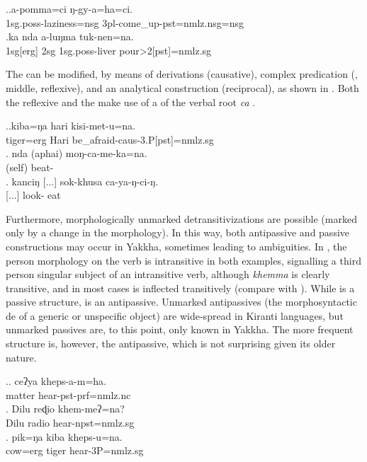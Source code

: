 \ex.\ag.a-pomma=ci ŋ-gy-a=ha=ci.\\
{\sc 1sg.poss-}laziness{\sc =nsg} {\sc 3pl-}come\_up{\sc -pst=nmlz.nsg=nsg}\\
\bg.ka nda         a-luŋma  tuk-nen=na.\\
{\sc 1sg[erg]} {\sc 2sg} {\sc 1sg.poss-}liver pour{>2[pst]=nmlz.sg}\\


The  can be modified, by means of derivations (causative), complex predication (, middle, reflexive), and an analytical construction (reciprocal), as shown in \Next. Both the  reflexive and the   make use of a  of the verbal root \emph{ca}  . 


\ex.\ag.kiba=ŋa hari kisi-met-u=na.\\
tiger{\sc =erg} Hari be\_afraid{\sc -caus-3.P[pst]=nmlz.sg}\\
\bg. nda (aphai) moŋ-ca-me-ka=na.\\
 (self) beat-\\
\bg. kanciŋ [...] sok-khusa ca-ya-ŋ-ci-ŋ.\\
  [...] look- eat\\



Furthermore, morphologically unmarked detransitivizations are possible (marked only by a change in the  morphology). In this way, both antipassive and passive constructions may occur in Yakkha, sometimes leading to ambiguities. In \Next, the person morphology on the verb is intransitive in both examples, signalling a third person singular subject of an intransitive verb, although \emph{khemma}  is clearly transitive, and in most cases is inflected transitively (compare with \Next[c]). While \Next[a] is a passive structure, \Next[b] is an antipassive. Unmarked antipassives (the morphosyntactic de of a generic or unspecific object) are wide-spread in Kiranti languages, but unmarked passives are, to this point, only known in Yakkha. The more frequent structure is, however, the antipassive, which is not surprising given its older nature.

\ex.\ag. ceʔya kheps-a-m=ha.\\
matter hear{\sc [3sg]-pst-prf=nmlz.nc}\\
\bg. Dilu  reɖio khem-meʔ=na?\\
Dilu radio  hear{\sc [3sg]-npst=nmlz.sg}\\
\bg. pik=ŋa kiba kheps-u=na.\\
cow{\sc =erg} tiger hear{\sc [pst]-3P=nmlz.sg}\\



